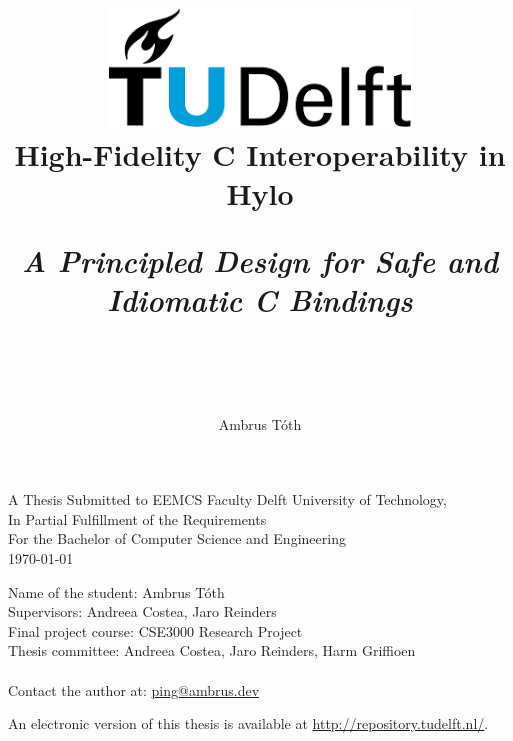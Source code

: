 \title{
    \includegraphics[width=8cm, keepaspectratio]{tudelftlogo.png}\\
    \vspace*{2cm}
    \textbf{
        {High-Fidelity C Interoperability in Hylo}
    }\\
    \vspace*{0.5cm}
    
    \parbox{0.9\linewidth}{
        \centering
        \textit{A Principled Design for Safe and Idiomatic C Bindings}
    }\\

    \vspace*{.3cm}


    \author{
        Ambrus Tóth\\
    }
}


\date{}

\maketitle
\thispagestyle{empty}

\let\clearpagebackup\clearpage
\renewcommand{\clearpage}{ }

\onecolumn

\begin{center}
    A Thesis Submitted to EEMCS Faculty Delft University of Technology,\\
    In Partial Fulfillment of the Requirements\\
    For the Bachelor of Computer Science and Engineering\\
    \today
\end{center}

\vspace*{2cm}

\noindent
{\small
Name of the student: Ambrus Tóth\\
Supervisors: Andreea Costea, Jaro Reinders\\
Final project course: CSE3000 Research Project\\
Thesis committee: Andreea Costea, Jaro Reinders, Harm Griffioen\\ \\
Contact the author at: \href{mailto:ping@ambrus.dev}{ping@ambrus.dev}
}
\vfill

\begin{center}
    An electronic version of this thesis is available at \url{http://repository.tudelft.nl/}.
\end{center}

\twocolumn
\let\clearpage\clearpagebackup  
\clearpage
